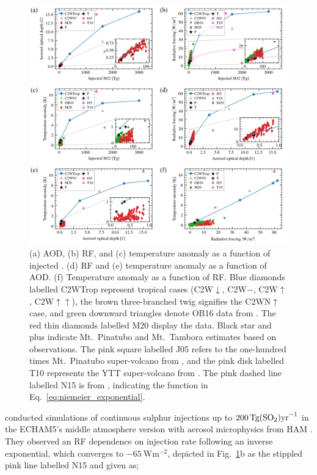 \documentclass[draft]{agujournal2019}
\begin{document}
\begin{figure}
  \centering
  \includegraphics[width=\textwidth]{figure4.png}

  \caption{(a) AOD, (b) RF, and (c) temperature anomaly as a function of injected
    \@. (d) RF and (e) temperature anomaly as a function of AOD. (f) Temperature
    anomaly as a function of RF. Blue diamonds labelled C2WTrop represent tropical cases
    (C2W\(\downarrow\), C2W\(-\), C2W\(\uparrow\), C2W\(\uparrow\uparrow\)), the brown
    three-branched twig signifies the C2WN\(\uparrow\) case, and green downward triangles
    denote OB16 data from . The red thin diamonds labelled M20
    display the  data. Black star and plus indicate Mt.\ Pinatubo
    and Mt.\ Tambora estimates based on observations. The pink square labelled J05 refers to
    the one-hundred times Mt.\ Pinatubo super-volcano from , and the pink
    disk labelled T10 represents the YTT super-volcano from . The pink
    dashed line labelled N15 is from , indicating the function in
    Eq.~\ref{eq:niemeier_exponential}.}\label{fig:4_parameter_scan}%
\end{figure}

 conducted simulations of continuous sulphur injections up to
\(\SI{200}{\tera\gram(\ce{SO2})\mathrm{yr}^{-1}}\) in the ECHAM5's middle atmosphere
version \cite{giorgetta2006} with aerosol microphysics from HAM \cite{stier2005}. They
observed an RF dependence on  injection rate following an inverse exponential,
which converges to \(\SI{-65}{\watt\meter^{-2}}\), depicted in
Fig.~\ref{fig:4_parameter_scan}b as the stippled pink line labelled N15 and given as;
\end{document}
